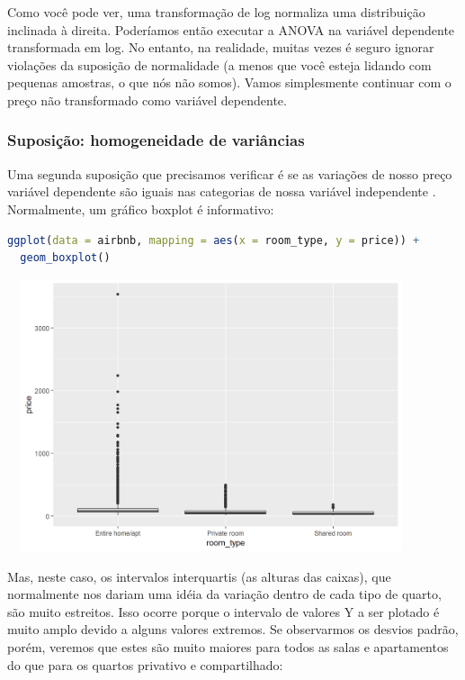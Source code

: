 \documentclass{article}
\begin{document}
Como você pode ver, uma transformação de log normaliza uma distribuição inclinada à direita. Poderíamos então executar a ANOVA na variável dependente transformada em log. No entanto, na realidade, muitas vezes é seguro ignorar violações da suposição de normalidade (a menos que você esteja lidando com pequenas amostras, o que nós não somos). Vamos simplesmente continuar com o preço não transformado como variável dependente.


\subsubsection{Suposição: homogeneidade de variâncias}

Uma segunda suposição que precisamos verificar é se as variações de nosso preço variável dependente são iguais nas categorias de nossa variável independente . Normalmente, um gráfico boxplot é informativo:

\begin{lstlisting}[language=R]
ggplot(data = airbnb, mapping = aes(x = room_type, y = price)) + 
  geom_boxplot()
\end{lstlisting}

\begin{center}
\includegraphics[width=12cm,height=8cm]{modelling_boxplot2-1.png} 
\end{center}

Mas, neste caso, os intervalos interquartis (as alturas das caixas), que normalmente nos dariam uma idéia da variação dentro de cada tipo de quarto, são muito estreitos. Isso ocorre porque o intervalo de valores Y a ser plotado é muito amplo devido a alguns valores extremos. Se observarmos os desvios padrão, porém, veremos que estes são muito maiores para todos as salas e apartamentos do que para os quartos privativo e compartilhado:
\end{document}
